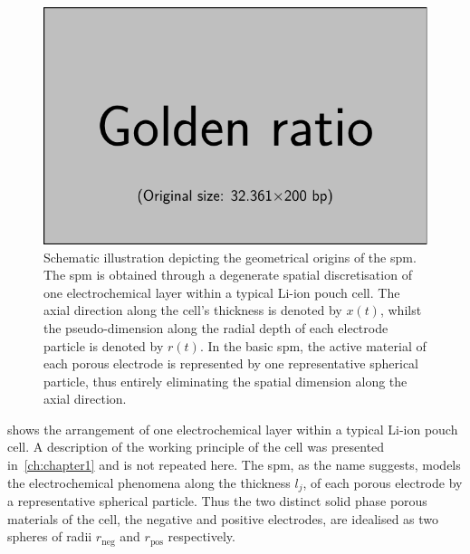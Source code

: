 \begin{figure}[h]
    \centering
    \includegraphics[width=\textwidth]{placeholder_images/example-image-golden.pdf}
    \caption[Schematic illustration depicting geometrical origins of the \gls{spm}]
    {Schematic illustration depicting the geometrical origins of the \gls{spm}. The \gls{spm} is obtained through a degenerate spatial discretisation of one electrochemical layer within a typical Li-ion pouch cell. The axial direction along the cell's thickness is denoted by $x(t)$, whilst the pseudo-dimension along the radial depth of each electrode particle is denoted by $r(t)$. In the basic \gls{spm}, the active material of each porous electrode is represented by one representative spherical particle, thus entirely eliminating the spatial dimension along the axial direction.}
    \label{fig:sandwichtospm}
\end{figure}


  shows the  arrangement  of  one electrochemical  layer
within a  typical Li-ion pouch cell.  A description of the  working principle of
the  cell was  presented in~\cref{ch:chapter1}  and  is not  repeated here.  The
\gls{spm}, as the name suggests,  models the electrochemical phenomena along the
thickness  $l_j$, \jinnegpos{}  of  each porous  electrode  by a  representative
spherical particle.  Thus the two distinct  solid phase porous materials  of the
cell, \ie{} the  negative and positive electrodes, are idealised  as two spheres
of radii $r_\text{neg}$ and $r_\text{pos}$ respectively.


